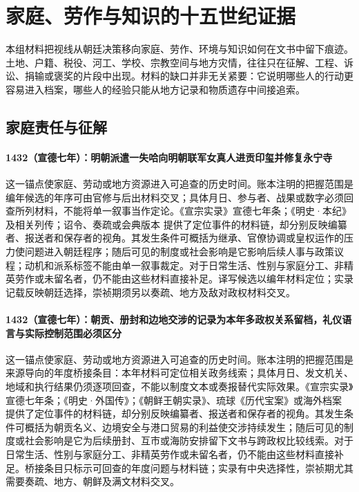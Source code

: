 \section{家庭、劳作与知识的十五世纪证据}

本组材料把视线从朝廷决策移向家庭、劳作、环境与知识如何在文书中留下痕迹。土地、户籍、税役、河工、学校、宗教空间与地方灾情，往往只在征解、工程、诉讼、捐输或褒奖的片段中出现。材料的缺口并非无关紧要：它说明哪些人的行动更容易进入档案，哪些人的经验只能从地方记录和物质遗存中间接追索。

\subsection{家庭责任与征解}

\paragraph{1432（宣德七年）：明朝派遣一失哈向明朝联军女真人进贡印玺并修复永宁寺} 这一锚点使家庭、劳动或地方资源进入可追查的历史时间。账本注明的把握范围是编年候选的年序可由官修与后出材料交叉；具体月日、参与者、战果或数字必须回查所列材料，不能将单一叙事当作定论。《宣宗实录》宣德七年条；《明史·本纪》及相关列传；诏令、奏疏或会典版本 提供了定位事件的材料链，却分别反映编纂者、报送者和保存者的视角。其发生条件可概括为继承、官僚协调或皇权运作的压力使问题进入朝廷程序；随后可见的制度或社会影响是它影响后续人事与政策议程；动机和派系标签不能由单一叙事裁定。对于日常生活、性别与家庭分工、非精英劳作或未留名者，仍不能由这些材料直接补足。译写候选以编年材料定位；实录记载反映朝廷选择，崇祯期须另以奏疏、地方及敌对政权材料交叉。

\paragraph{1432（宣德七年）：朝贡、册封和边地交涉的记录为本年多政权关系留档，礼仪语言与实际控制范围必须区分} 这一锚点使家庭、劳动或地方资源进入可追查的历史时间。账本注明的把握范围是来源导向的年度桥接条目：本年材料可定位相关政务线索；具体月日、发文机关、地域和执行结果仍须逐项回查，不能以制度文本或奏报替代实际效果。《宣宗实录》宣德七年条；《明史·外国传》；《朝鲜王朝实录》、琉球《历代宝案》或海外档案 提供了定位事件的材料链，却分别反映编纂者、报送者和保存者的视角。其发生条件可概括为朝贡名义、边境安全与港口贸易的利益使交涉持续发生；随后可见的制度或社会影响是它为后续册封、互市或海防安排留下文书与跨政权比较线索。对于日常生活、性别与家庭分工、非精英劳作或未留名者，仍不能由这些材料直接补足。桥接条目只标示可回查的年度问题与材料链；实录有中央选择性，崇祯期尤其需要奏疏、地方、朝鲜及满文材料交叉。

